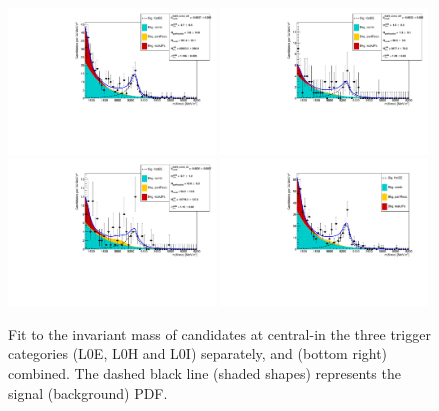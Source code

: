 %
\begin{figure}[h!]
\centering
\includegraphics[width=0.49\textwidth]{RKst/figs/Fit/fit_EE/KstEE_central_L0E.pdf}
\includegraphics[width=0.49\textwidth]{RKst/figs/Fit/fit_EE/KstEE_central_L0H.pdf}
\includegraphics[width=0.49\textwidth]{RKst/figs/Fit/fit_EE/KstEE_central_L0I.pdf}
\includegraphics[width=0.49\textwidth]{RKst/figs/Fit/fit_EE/fit_EEc.pdf}
\caption{Fit to the \mKpiee invariant mass of \BdToKstee candidates at central-\qsq in the three trigger categories (L0E, L0H and L0I) separately, and (bottom right) combined. The dashed black line (shaded shapes) represents the signal (background) PDF.}
\label{fig:fitEE_central}
\end{figure}
